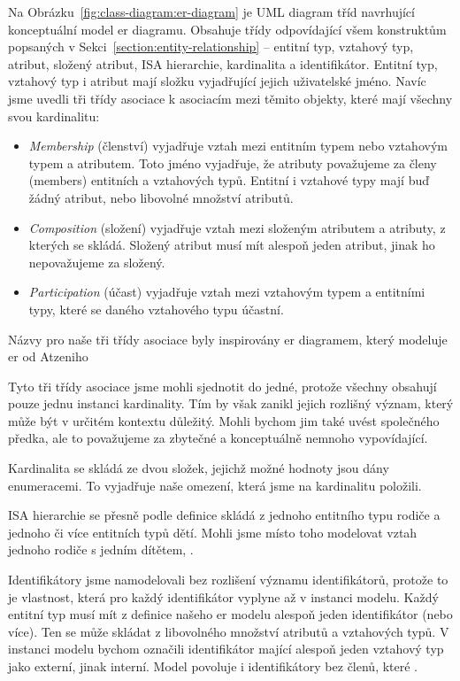 Na Obrázku~\ref{fig:class-diagram:er-diagram} je \acrshort{UML} diagram tříd navrhující konceptuální model \acrshort{er} diagramu.
Obsahuje třídy odpovídající všem konstruktům popsaných v Sekci~\ref{section:entity-relationship} -- entitní typ, vztahový typ, atribut, složený atribut, ISA hierarchie, kardinalita a identifikátor.
Entitní typ, vztahový typ i atribut mají složku vyjadřující jejich uživatelské jméno.
Navíc jsme uvedli tři třídy asociace k asociacím mezi těmito objekty, které mají všechny svou kardinalitu:
\begin{itemize}
  \item \emph{Membership} (členství) vyjadřuje vztah mezi entitním typem nebo vztahovým typem a atributem.
        Toto jméno vyjadřuje, že atributy považujeme za členy (members) entitních a vztahových typů.
        Entitní i vztahové typy mají buď žádný atribut, nebo libovolné množství atributů.
  \item \emph{Composition} (složení) vyjadřuje vztah mezi složeným atributem a atributy, z kterých se skládá.
        Složený atribut musí mít alespoň jeden atribut, jinak ho nepovažujeme za složený.
  \item \emph{Participation} (účast) vyjadřuje vztah mezi vztahovým typem a entitními typy, které se daného vztahového typu účastní.
\end{itemize}

Názvy pro naše tři třídy asociace byly inspirovány \acrshort{er} diagramem, který modeluje \acrshort{er} od Atzeniho~\cite[Obr.~5.22]{atzeni_database_1999}

Tyto tři třídy asociace jsme mohli sjednotit do jedné, protože všechny obsahují pouze jednu instanci kardinality.
Tím by však zanikl jejich rozlišný význam, který může být v určitém kontextu důležitý.
Mohli bychom jim také uvést společného předka, ale to považujeme za zbytečné a konceptuálně nemnoho vypovídající.

Kardinalita se skládá ze dvou složek, jejichž možné hodnoty jsou dány enumeracemi.
To vyjadřuje naše omezení, která jsme na kardinalitu položili.

ISA hierarchie se přesně podle definice skládá z jednoho entitního typu rodiče a jednoho či více entitních typů dětí.
Mohli jsme místo toho modelovat vztah jednoho rodiče s jedním dítětem, .

Identifikátory jsme namodelovali bez rozlišení významu  identifikátorů, protože to je vlastnost, která pro každý identifikátor vyplyne až v instanci modelu.
Každý entitní typ musí mít z definice našeho \acrshort{er} modelu alespoň jeden identifikátor (nebo více).
Ten se může skládat z libovolného množství atributů a vztahových typů.
V instanci modelu bychom označili identifikátor mající alespoň jeden vztahový typ jako externí, jinak interní.
Model povoluje i identifikátory bez členů, které .

